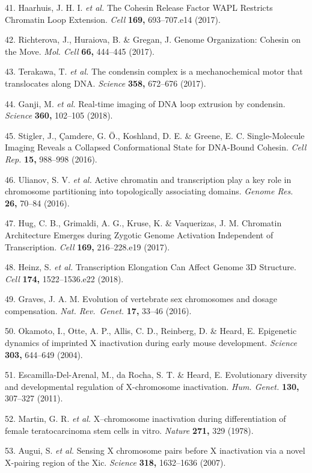 \documentclass[11pt,twoside]{MPIthesis}
\theoremstyle{definition}
\theoremstyle{definition}
\theoremstyle{definition}
\theoremstyle{remark}
\begin{document}
41. Haarhuis, J. H. I. \emph{et al.} The Cohesin Release Factor WAPL
Restricts Chromatin Loop Extension. \emph{Cell} \textbf{169,}
693--707.e14 (2017).

42. Richterova, J., Huraiova, B. \& Gregan, J. Genome Organization:
Cohesin on the Move. \emph{Mol. Cell} \textbf{66,} 444--445 (2017).

43. Terakawa, T. \emph{et al.} The condensin complex is a
mechanochemical motor that translocates along DNA. \emph{Science}
\textbf{358,} 672--676 (2017).

44. Ganji, M. \emph{et al.} Real-time imaging of DNA loop extrusion by
condensin. \emph{Science} \textbf{360,} 102--105 (2018).

45. Stigler, J., Çamdere, G. Ö., Koshland, D. E. \& Greene, E. C.
Single-Molecule Imaging Reveals a Collapsed Conformational State for
DNA-Bound Cohesin. \emph{Cell Rep.} \textbf{15,} 988--998 (2016).

46. Ulianov, S. V. \emph{et al.} Active chromatin and transcription play
a key role in chromosome partitioning into topologically associating
domains. \emph{Genome Res.} \textbf{26,} 70--84 (2016).

47. Hug, C. B., Grimaldi, A. G., Kruse, K. \& Vaquerizas, J. M.
Chromatin Architecture Emerges during Zygotic Genome Activation
Independent of Transcription. \emph{Cell} \textbf{169,} 216--228.e19
(2017).

48. Heinz, S. \emph{et al.} Transcription Elongation Can Affect Genome
3D Structure. \emph{Cell} \textbf{174,} 1522--1536.e22 (2018).

49. Graves, J. A. M. Evolution of vertebrate sex chromosomes and dosage
compensation. \emph{Nat. Rev.~Genet.} \textbf{17,} 33--46 (2016).

50. Okamoto, I., Otte, A. P., Allis, C. D., Reinberg, D. \& Heard, E.
Epigenetic dynamics of imprinted X inactivation during early mouse
development. \emph{Science} \textbf{303,} 644--649 (2004).

51. Escamilla-Del-Arenal, M., da Rocha, S. T. \& Heard, E. Evolutionary
diversity and developmental regulation of X-chromosome inactivation.
\emph{Hum. Genet.} \textbf{130,} 307--327 (2011).

52. Martin, G. R. \emph{et al.} X--chromosome inactivation during
differentiation of female teratocarcinoma stem cells in vitro.
\emph{Nature} \textbf{271,} 329 (1978).

53. Augui, S. \emph{et al.} Sensing X chromosome pairs before X
inactivation via a novel X-pairing region of the Xic. \emph{Science}
\textbf{318,} 1632--1636 (2007).
\end{document}
